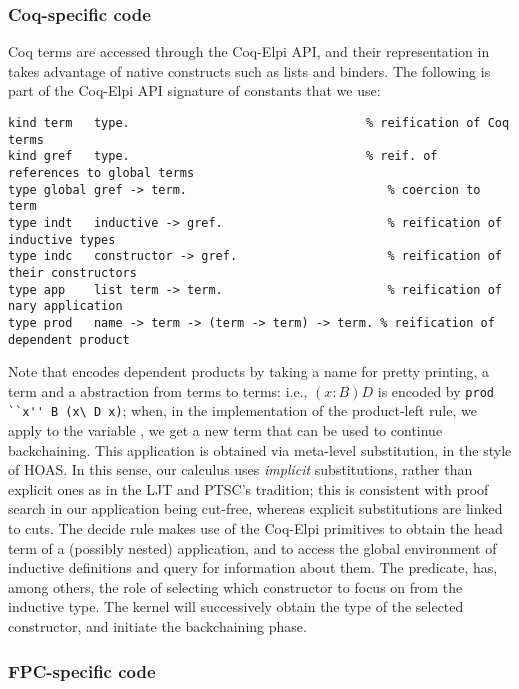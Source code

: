 \subsubsection{Coq-specific code}
Coq terms are accessed through the Coq-Elpi API, and their representation
in \lP takes advantage of native \lP constructs such as lists and binders.
The following is part of the Coq-Elpi API signature of constants that we use:
\begin{lstlisting}[language=lprolog]
kind term   type.                                 % reification of Coq terms
kind gref   type.                                 % reif. of references to global terms
type global gref -> term.                            % coercion to term
type indt   inductive -> gref.                       % reification of inductive types
type indc   constructor -> gref.                     % reification of their constructors 
type app    list term -> term.                       % reification of nary application
type prod   name -> term -> (term -> term) -> term. % reification of dependent product
\end{lstlisting}
%
Note that  encodes dependent products by taking a name for pretty
printing, a term and a \lP abstraction from terms to terms: i.e., $(x :
B) D$ is encoded by \verb|prod ``x'' B (x\ D x)|; when, in the
implementation of the product-left rule, we apply  to the variable
, we get a new term that can be used to continue backchaining. This
application is obtained via meta-level substitution, in the style of HOAS. In
this sense, our calculus uses \emph{implicit} substitutions, rather than
explicit ones as in the  LJT and PTSC's tradition; this is consistent with proof search in
our application being cut-free, whereas explicit substitutions are linked to cuts.
The decide rule makes use of the Coq-Elpi primitives
 to obtain the head term of a (possibly
nested) application, and  to access the global
environment of inductive definitions and query for information about them.
The  predicate,  has, among others, the role of selecting which
constructor to focus on from the inductive type. The kernel will successively
obtain the type of the selected constructor, and initiate the backchaining
phase.

\subsubsection{FPC-specific code}
\label{ssec:fpc}

